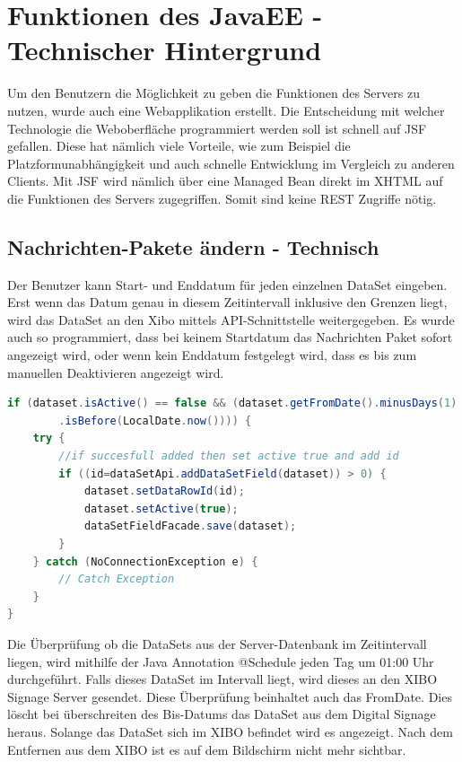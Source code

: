 \section{Funktionen des JavaEE - Technischer Hintergrund}
\label{sec:javaeetechnicalbackground}
Um den Benutzern die Möglichkeit zu geben die Funktionen des Servers zu nutzen, wurde auch eine Webapplikation erstellt. Die Entscheidung mit welcher Technologie die Weboberfläche programmiert werden soll ist schnell auf JSF gefallen. Diese hat nämlich viele Vorteile, wie zum Beispiel die Platzformunabhängigkeit und auch schnelle Entwicklung im Vergleich zu anderen Clients. Mit JSF wird nämlich über eine Managed Bean direkt im XHTML auf die Funktionen des Servers zugegriffen. Somit sind keine REST Zugriffe nötig.

\subsection{Nachrichten-Pakete ändern - Technisch}\label{sec:datasetexpiredatetechnical}
Der Benutzer kann Start- und Enddatum für jeden einzelnen DataSet eingeben. Erst wenn das Datum genau in diesem Zeitintervall inklusive den Grenzen liegt, wird das DataSet an den Xibo mittels API-Schnittstelle weitergegeben. Es wurde auch so programmiert, dass bei keinem Startdatum das Nachrichten Paket sofort angezeigt wird, oder wenn kein Enddatum festgelegt wird, dass es bis zum manuellen Deaktivieren angezeigt wird.

\begin{lstlisting}[language=Java, caption={public void doCheckEvery24Hours()}]
if (dataset.isActive() == false && (dataset.getFromDate().minusDays(1)
        .isBefore(LocalDate.now()))) {
    try {
        //if succesfull added then set active true and add id
        if ((id=dataSetApi.addDataSetField(dataset)) > 0) {
            dataset.setDataRowId(id);
            dataset.setActive(true);
            dataSetFieldFacade.save(dataset);
        }
    } catch (NoConnectionException e) {
        // Catch Exception
    }
}
\end{lstlisting}

Die Überprüfung ob die DataSets aus der Server-Datenbank im Zeitintervall liegen, wird mithilfe der Java Annotation @Schedule jeden Tag um 01:00 Uhr durchgeführt. Falls dieses DataSet im Intervall liegt, wird dieses an den XIBO Signage Server gesendet. Diese Überprüfung beinhaltet auch das FromDate. Dies löscht bei überschreiten des Bis-Datums das DataSet aus dem Digital Signage heraus. Solange das DataSet sich im XIBO befindet wird es angezeigt. Nach dem Entfernen aus dem XIBO ist es auf dem Bildschirm nicht mehr sichtbar.

